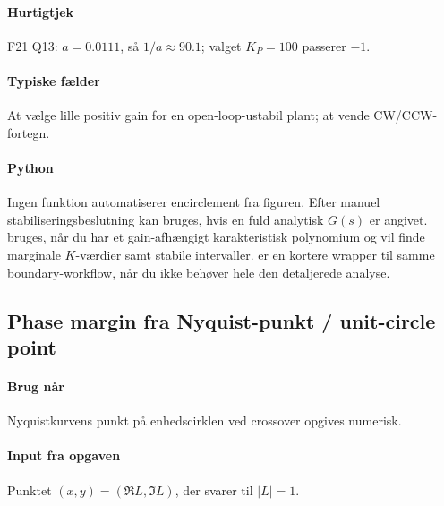 \paragraph{Hurtigtjek}
F21 Q13: \(a=0.0111\), så \(1/a\approx90.1\); valget \(K_P=100\) passerer \(-1\).

\paragraph{Typiske fælder}
At vælge lille positiv gain for en open-loop-ustabil plant; at vende CW/CCW-fortegn.

\paragraph{Python}
Ingen funktion automatiserer encirclement fra figuren. Efter manuel stabiliseringsbeslutning
kan  bruges, hvis en fuld analytisk \(G(s)\) er angivet.
 bruges, når du har et gain-afhængigt
karakteristisk polynomium og vil finde marginale \(K\)-værdier samt stabile intervaller.
 er en kortere wrapper til samme
boundary-workflow, når du ikke behøver hele den detaljerede analyse.

\subsection{Phase margin fra Nyquist-punkt / unit-circle point}

\paragraph{Brug når}
Nyquistkurvens punkt på enhedscirklen ved crossover opgives numerisk.

\paragraph{Input fra opgaven}
Punktet \((x,y)=(\Re L,\Im L)\), der svarer til \(|L|=1\).

